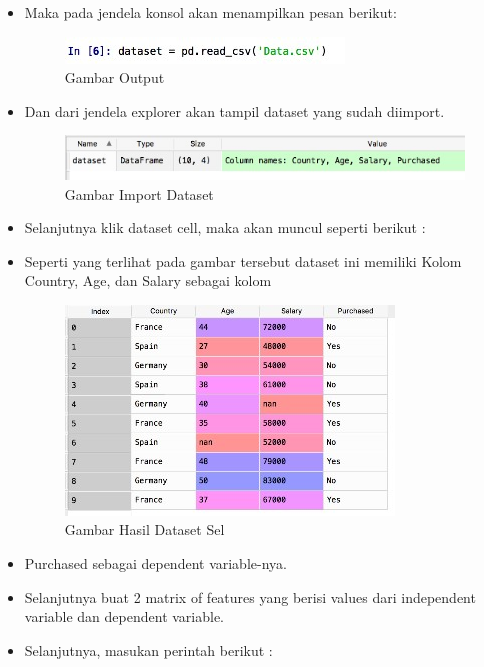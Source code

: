 \begin{enumerate}
\begin{itemize}
\item Maka pada jendela konsol akan menampilkan pesan berikut:

\begin{figure}[ht]
\centering
\includegraphics[scale=0.8]{figures/c3jesron3.jpeg}
\caption{Gambar Output}
\label{contoh}
\end{figure}

\item Dan dari jendela explorer akan tampil dataset yang sudah diimport.

\begin{figure}[ht]
\centering
\includegraphics[scale=0.5]{figures/c3jesron4.jpeg}
\caption{Gambar Import Dataset}
\label{contoh}
\end{figure}

\item Selanjutnya klik dataset cell, maka akan muncul seperti berikut :
\item Seperti yang terlihat pada gambar tersebut dataset ini memiliki Kolom Country, Age, dan Salary sebagai kolom

\begin{figure}[ht]
\centering
\includegraphics[scale=0.5]{figures/c3jesron5.jpeg}
\caption{Gambar Hasil Dataset Sel}
\label{contoh}
\end{figure}

\item Purchased sebagai dependent variable-nya.
\item Selanjutnya buat 2 matrix of features yang berisi values dari independent variable dan dependent variable.
\item Selanjutnya, masukan perintah berikut :


\end{itemize}
\end{enumerate}
